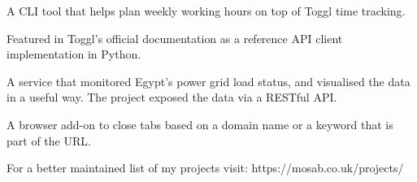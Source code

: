 \begin{cvprojects}
	\begin{cvitems} %
		\item {
			A CLI tool that helps plan weekly working hours on top of Toggl
			time tracking.
		}
		\item {
			Featured in Toggl's official documentation as a reference API client
			implementation in Python.
		}
	\end{cvitems}

	\begin{cvitems} %
		\item {
			A service that monitored Egypt's power grid load status, and visualised
			the data in a useful way. The project exposed the data via a RESTful
			API.
		}
	\end{cvitems}

	\begin{cvitems} %
		\item {
			A browser add-on to close tabs based on a domain name or a keyword that
			is part of the URL.
		}
	\end{cvitems}

	\begin{cvitems} %
		\item {
				For a better maintained list of my projects visit: https://mosab.co.uk/projects/
		}
	\end{cvitems}
\end{cvprojects}
